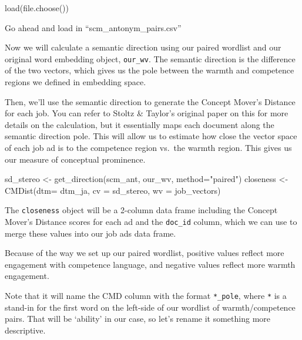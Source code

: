 \documentclass[
  letterpaper,
  DIV=11,
  numbers=noendperiod]{scrreprt}
\newenvironment{Shaded}{\begin{snugshade}}{\end{snugshade}}
\newcommand{\AttributeTok}[1]{\textcolor[rgb]{0.40,0.45,0.13}{#1}}
\newcommand{\FunctionTok}[1]{\textcolor[rgb]{0.28,0.35,0.67}{#1}}
\newcommand{\NormalTok}[1]{\textcolor[rgb]{0.00,0.23,0.31}{#1}}
\newcommand{\OtherTok}[1]{\textcolor[rgb]{0.00,0.23,0.31}{#1}}
\newcommand{\StringTok}[1]{\textcolor[rgb]{0.13,0.47,0.30}{#1}}
\begin{document}
\begin{Shaded}
\begin{Highlighting}[]
\FunctionTok{load}\NormalTok{(}\FunctionTok{file.choose}\NormalTok{())}
\end{Highlighting}
\end{Shaded}

Go ahead and load in ``scm\_antonym\_pairs.csv''

Now we will calculate a semantic direction using our paired wordlist and
our original word embedding object, \texttt{our\_wv}. The semantic
direction is the difference of the two vectors, which gives us the pole
between the warmth and competence regions we defined in embedding space.

Then, we'll use the semantic direction to generate the Concept Mover's
Distance for each job. You can refer to Stoltz \& Taylor's original
paper on this for more details on the calculation, but it essentially
maps each document along the semantic direction pole. This will allow us
to estimate how close the vector space of each job ad is to the
competence region vs.~the warmth region. This gives us our measure of
conceptual prominence.

\begin{Shaded}
\begin{Highlighting}[]
\NormalTok{sd\_stereo }\OtherTok{\textless{}{-}} \FunctionTok{get\_direction}\NormalTok{(scm\_ant, our\_wv, }\AttributeTok{method=}\StringTok{"paired"}\NormalTok{)}
\NormalTok{closeness }\OtherTok{\textless{}{-}} \FunctionTok{CMDist}\NormalTok{(}\AttributeTok{dtm=}\NormalTok{ dtm\_ja, }\AttributeTok{cv =}\NormalTok{ sd\_stereo, }\AttributeTok{wv =}\NormalTok{ job\_vectors)}
\end{Highlighting}
\end{Shaded}

The \texttt{closeness} object will be a 2-column data frame including
the Concept Mover's Distance scores for each ad and the \texttt{doc\_id}
column, which we can use to merge these values into our job ads data
frame.

Because of the way we set up our paired wordlist, positive values
reflect more engagement with competence language, and negative values
reflect more warmth engagement.

Note that it will name the CMD column with the format \texttt{*\_pole},
where \texttt{*} is a stand-in for the first word on the left-side of
our wordlist of warmth/competence pairs. That will be `ability' in our
case, so let's rename it something more descriptive.
\end{document}
